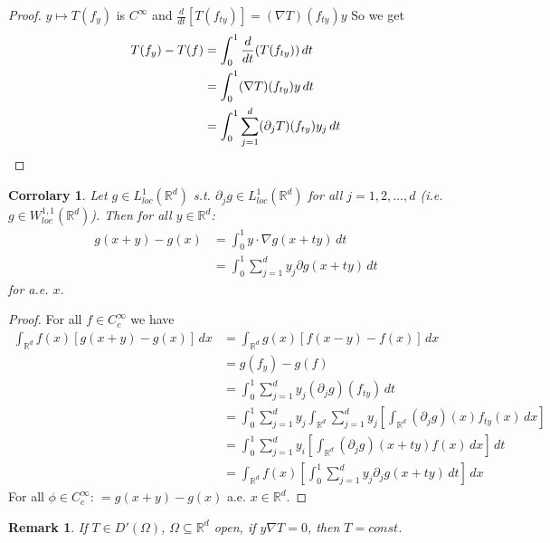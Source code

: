 \documentclass{report}
\theoremstyle{tommy}
\newtheorem{cor}[defn]{Corrolary}
\newtheorem{rem}[defn]{Remark}
\begin{document}
  \begin{proof}
    \(y \mapsto T(f_y)\) is \(C^\infty\) and \(\frac{d}{dt} [T(f_{ty})] = (\nabla T)(f_{ty}) y\) So we get
    \begin{align*}
      T(f_y) - T(f) 
      &= \int_0^1 \frac{d}{dt}(T(f_{ty})) \, dt \\
      &= \int_0^1 (\nabla T)(f_{ty}) y \, dt \\
      &= \int_0^1 \sum_{j=1}^d (\partial_j T)(f_{ty}) y_j \, dt \qedhere
    \end{align*}
  \end{proof}

  
  \begin{cor}
    Let \(g \in L_{loc}^1(\mathbb{R}^d)\) s.t. \(\partial_j g\in L_{loc}^1(\mathbb{R}^d)\) for all \(j = 1, 2, \dots, d\) (i.e. \(g \in W_{loc}^{1,1}(\mathbb{R}^d)\)). Then for all \(y \in \mathbb{R}^d\):
    \begin{align*}
      g(x+y) - g(x) &= \int_0^1 y \cdot \nabla g(x + ty) \, dt \\
      &= \int_0^1 \sum_{j=1}^d y_j \partial g(x+ty) \, dt
    \end{align*}
    for a.e. \(x\).
  \end{cor}

  \begin{proof}
    For all \(f \in C_c^\infty\) we have 
    \begin{align*}
      \int_{\mathbb{R}^d} f(x) [g(x+y) - g(x)] \, dx
      &= \int_{\mathbb{R}^d} g(x) [f(x-y) - f(x)] \, dx \\
      &= g(f_y) - g(f) \\
      &= \int_0^1 \sum_{j=1}^d y_j (\partial_j g)(f_{ty}) \, dt \\
      &= \int_0^1 \sum_{j=1}^d y_j \int_{\mathbb{R}^d} \sum_{j=1}^d y_j \left[\int_{\mathbb{R}^d} (\partial_j g)(x) f_{ty}(x) \, dx\right] \\
      &= \int_0^1 \sum_{j=1}^d y_i \left[\int_{\mathbb{R}^d}(\partial_j g)(x+ty) f(x) \, dx\right] \, dt \\
      &= \int_{\mathbb{R}^d} f(x) \left[\int_0^1 \sum_{j=1}^d y_j \partial_j g(x+ty) \, dt \right] \, dx
    \end{align*}
    For all \(\phi \in C_c^\infty\): \( = g(x+y) - g(x)\) a.e. \(x \in \mathbb{R}^d\).
  \end{proof}


  \begin{rem}
    If \(T \in D'(\Omega)\), \(\Omega \subseteq \mathbb{R}^d\) open, if \(y \nabla T = 0\), then \(T = const\).
  \end{rem}
\end{document}

